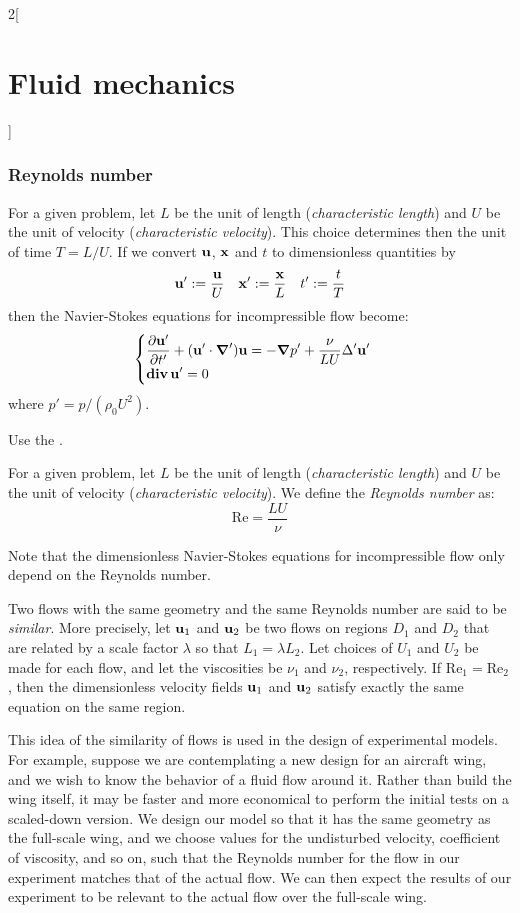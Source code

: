 \documentclass[../../../main_physics.tex]{subfiles}
\begin{document}
\begin{multicols}{2}[\section{Fluid mechanics}]
  \subsubsection{Reynolds number}
  \begin{proposition}
    For a given problem, let $L$ be the unit of length (\emph{characteristic length}) and $U$ be the unit of velocity (\emph{characteristic velocity}). This choice determines then the unit of time $T=L/U$. If we convert $\boldsymbol{\mathrm{u}}$, $\boldsymbol{\mathrm{x}}$ and $t$ to dimensionless quantities by
    $$
      \boldsymbol{\mathrm{u}}':= \frac{\boldsymbol{\mathrm{u}}}{U}\quad \boldsymbol{\mathrm{x}}':=\frac{\boldsymbol{\mathrm{x}}}{L}\quad t':=\frac{t}{T}
    $$
    then the Navier-Stokes equations for incompressible flow become:
    $$
      \begin{cases}
        \displaystyle\pdv{\boldsymbol{\mathrm{u}}'}{t'}+(\boldsymbol{\mathrm{u}}'\cdot\grad')\boldsymbol{\mathrm{u}}=-\grad p' + \frac{\nu}{LU}\Delta'\boldsymbol{\mathrm{u}}' \\
        \displaystyle\operatorname{\boldsymbol{\mathrm{div}}}\boldsymbol{\mathrm{u}}'=0
      \end{cases}
    $$
    where $p'=p/(\rho_0 U^2)$.
  \end{proposition}
  \begin{sproof}
    Use the .
  \end{sproof}
  \begin{definition}
    For a given problem, let $L$ be the unit of length (\emph{characteristic length}) and $U$ be the unit of velocity (\emph{characteristic velocity}). We define the \emph{Reynolds number} as:
    $$
      \mathrm{Re}=\frac{LU}{\nu}
    $$
  \end{definition}
  \begin{remark}
    Note that the dimensionless Navier-Stokes equations for incompressible flow only depend on the Reynolds number.
  \end{remark}
  \begin{definition}
    Two flows with the same geometry and the same Reynolds number are said to be \emph{similar}. More precisely, let $\boldsymbol{\mathrm{u}}_1$ and $\boldsymbol{\mathrm{u}}_2$ be two flows on regions $D_1$
    and $D_2$ that are related by a scale factor $\lambda$ so that $L_1 = \lambda L_2$. Let choices
    of $U_1$ and $U_2$ be made for each flow, and let the viscosities be $\nu_1$ and $\nu_2$, respectively. If $\mathrm{Re}_1=\mathrm{Re}_2$, then the dimensionless velocity fields $\boldsymbol{\mathrm{u}}_1$ and $\boldsymbol{\mathrm{u}}_2$ satisfy exactly the same equation on the same region.
  \end{definition}
  \begin{remark}
    This idea of the similarity of flows is used in the design of experimental models. For example, suppose we are contemplating a new design for an aircraft wing, and we wish to know the behavior of a fluid flow around it. Rather than build the wing itself, it may be faster and more economical to perform the initial tests on a scaled-down version. We design our model so that it has the same geometry as the full-scale wing, and we choose values for the undisturbed velocity, coefficient of viscosity, and so on, such that the Reynolds number for the flow in our experiment matches that of the actual flow. We can then expect the results of our experiment to be relevant to the actual flow over the full-scale wing.

\end{remark}
\end{multicols}
\end{document}
